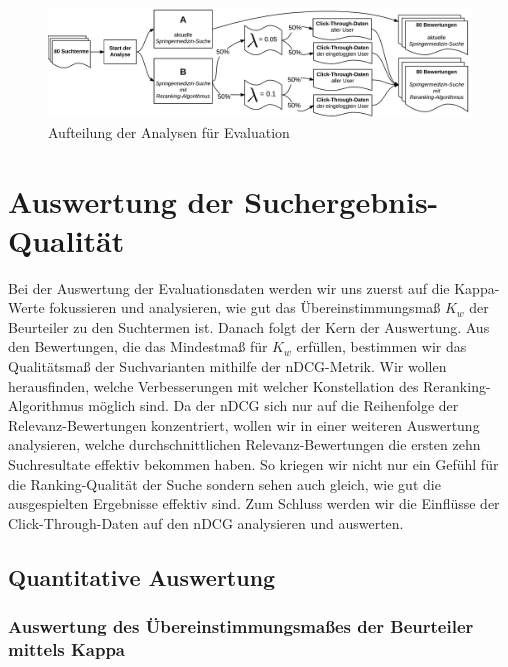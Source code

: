 \begin{figure}[H]
\centering
\vspace{-.5em}
\caption[Aufteilung der Analysen für Evaluation]{Aufteilung der Analysen für Evaluation}
\vspace{.5em}
\label{fig:AufteilungAnalysenEvaluation}
\includegraphics[width=0.9\linewidth]{gfx/EvaluationsvariantenRerankingSuche}
\vspace{-2em}
\end{figure}

\section{Auswertung der Suchergebnis-Qualität}
\label{sec:Evaluation:Auswertung}

Bei der Auswertung der Evaluationsdaten werden wir uns zuerst auf die Kappa-Werte fokussieren und analysieren, wie gut das Übereinstimmungsmaß $K_w$ der Beurteiler zu den Suchtermen ist. Danach folgt der Kern der Auswertung. Aus den Bewertungen, die das Mindestmaß für $K_w$ erfüllen, bestimmen wir das Qualitätsmaß der Suchvarianten mithilfe der nDCG-Metrik. Wir wollen herausfinden, welche Verbesserungen mit welcher Konstellation des Reranking-Algorithmus möglich sind. Da der nDCG sich nur auf die Reihenfolge der Relevanz-Bewertungen konzentriert, wollen wir in einer weiteren Auswertung analysieren, welche durchschnittlichen Relevanz-Bewertungen die ersten zehn Suchresultate effektiv bekommen haben. So kriegen wir nicht nur ein Gefühl für die Ranking-Qualität der Suche sondern sehen auch gleich, wie gut die ausgespielten Ergebnisse effektiv sind. Zum Schluss werden wir die Einflüsse der Click-Through-Daten auf den nDCG analysieren und auswerten.

\subsection{Quantitative Auswertung}
\label{sec:Evaluation:Auswertung:QuantitativeAuswertung}

\subsubsection{Auswertung des Übereinstimmungsmaßes der Beurteiler mittels Kappa}
\label{sec:Evaluation:Auswertung:QuantitativeAuswertung:Kappa}

